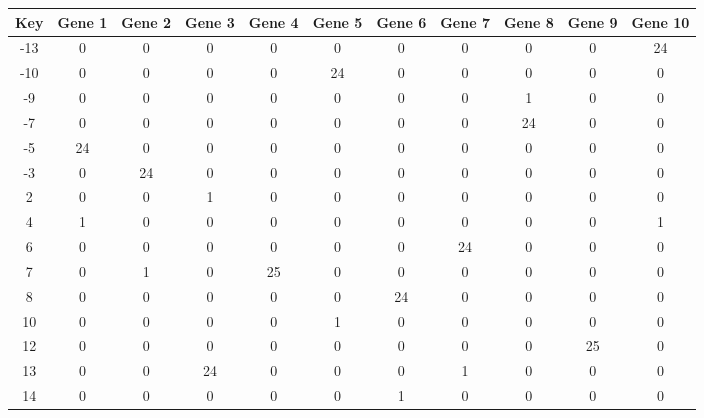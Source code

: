 \begin{tabular}{|c|c|c|c|c|c|c|c|c|c|c|}
\hline
Key & Gene 1 & Gene 2 & Gene 3 & Gene 4 & Gene 5 & Gene 6 & Gene 7 & Gene 8 & Gene 9 & Gene 10 \\
\hline
-13 & 0 & 0 & 0 & 0 & 0 & 0 & 0 & 0 & 0 & 24 \\
-10 & 0 & 0 & 0 & 0 & 24 & 0 & 0 & 0 & 0 & 0 \\
-9 & 0 & 0 & 0 & 0 & 0 & 0 & 0 & 1 & 0 & 0 \\
-7 & 0 & 0 & 0 & 0 & 0 & 0 & 0 & 24 & 0 & 0 \\
-5 & 24 & 0 & 0 & 0 & 0 & 0 & 0 & 0 & 0 & 0 \\
-3 & 0 & 24 & 0 & 0 & 0 & 0 & 0 & 0 & 0 & 0 \\
2 & 0 & 0 & 1 & 0 & 0 & 0 & 0 & 0 & 0 & 0 \\
4 & 1 & 0 & 0 & 0 & 0 & 0 & 0 & 0 & 0 & 1 \\
6 & 0 & 0 & 0 & 0 & 0 & 0 & 24 & 0 & 0 & 0 \\
7 & 0 & 1 & 0 & 25 & 0 & 0 & 0 & 0 & 0 & 0 \\
8 & 0 & 0 & 0 & 0 & 0 & 24 & 0 & 0 & 0 & 0 \\
10 & 0 & 0 & 0 & 0 & 1 & 0 & 0 & 0 & 0 & 0 \\
12 & 0 & 0 & 0 & 0 & 0 & 0 & 0 & 0 & 25 & 0 \\
13 & 0 & 0 & 24 & 0 & 0 & 0 & 1 & 0 & 0 & 0 \\
14 & 0 & 0 & 0 & 0 & 0 & 1 & 0 & 0 & 0 & 0 \\
\hline
\end{tabular}
